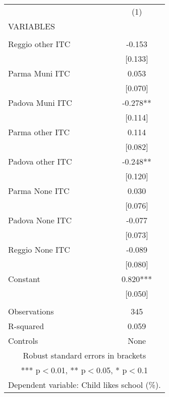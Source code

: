 \begin{tabular}{lc} \hline
 & (1) \\
VARIABLES &  \\ \hline
 &  \\
Reggio other ITC & -0.153 \\
 & [0.133] \\
Parma Muni ITC & 0.053 \\
 & [0.070] \\
Padova Muni ITC & -0.278** \\
 & [0.114] \\
Parma other ITC & 0.114 \\
 & [0.082] \\
Padova other ITC & -0.248** \\
 & [0.120] \\
Parma None ITC & 0.030 \\
 & [0.076] \\
Padova None ITC & -0.077 \\
 & [0.073] \\
Reggio None ITC & -0.089 \\
 & [0.080] \\
Constant & 0.820*** \\
 & [0.050] \\
 &  \\
Observations & 345 \\
R-squared & 0.059 \\
 Controls & None \\ \hline
\multicolumn{2}{c}{ Robust standard errors in brackets} \\
\multicolumn{2}{c}{ *** p$<$0.01, ** p$<$0.05, * p$<$0.1} \\
\multicolumn{2}{c}{ Dependent variable: Child likes school (\%).} \\
\end{tabular}
